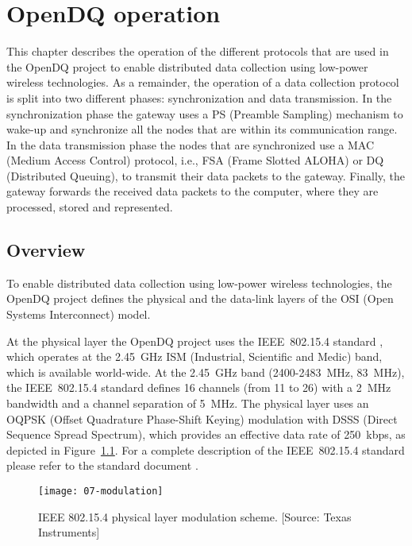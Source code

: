 \chapter{OpenDQ operation}
\label{sec:06-operation}
This chapter describes the operation of the different protocols that are used in the OpenDQ project to enable distributed data collection using low-power wireless technologies. As a remainder, the operation of a data collection protocol is split into two different phases: synchronization and data transmission. In the synchronization phase the gateway uses a PS (Preamble Sampling) mechanism to wake-up and synchronize all the nodes that are within its communication range. In the data transmission phase the nodes that are synchronized use a MAC (Medium Access Control) protocol, i.e., FSA (Frame Slotted ALOHA) or DQ (Distributed Queuing), to transmit their data packets to the gateway. Finally, the gateway forwards the received data packets to the computer, where they are processed, stored and represented.

\section{Overview}
To enable distributed data collection using low-power wireless technologies, the OpenDQ project defines the physical and the data-link layers of the OSI (Open Systems Interconnect) model.

At the physical layer the OpenDQ project uses the IEEE~802.15.4 standard \cite{ieee802.15.4-2006}, which operates at the 2.45~GHz ISM (Industrial, Scientific and Medic) band, which is available world-wide. At the 2.45~GHz band (2400-2483~MHz, 83~MHz), the IEEE~802.15.4 standard defines 16 channels (from 11 to 26) with a 2~MHz bandwidth and a channel separation of 5~MHz. The physical layer uses an OQPSK (Offset Quadrature Phase-Shift Keying) modulation with DSSS (Direct Sequence Spread Spectrum), which provides an effective data rate of 250~kbps, as depicted in Figure~\ref{fig:07-modulation}. For a complete description of the IEEE~802.15.4 standard please refer to the standard document \cite{ieee802.15.4-2006}.

\begin{figure}[!ht]
    \centering
	\texttt{[image: 07-modulation]}
    \caption[IEEE 802.15.4 physical layer modulation scheme]{IEEE 802.15.4 physical layer modulation scheme. [Source: Texas Instruments]}
    \label{fig:07-modulation}
\end{figure}

